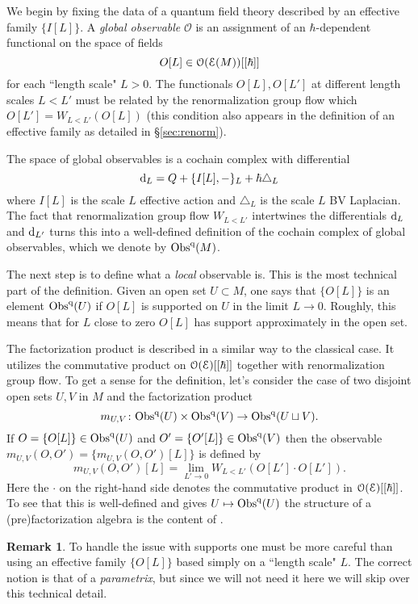 \documentclass[11pt, oneside, reqno]{amsart}
\theoremstyle{definition} \newtheorem{definition}{Definition}[section]
\theoremstyle{definition}
\theoremstyle{remark}
\theoremstyle{definition} \newtheorem{remark}[definition]{Remark}
\theoremstyle{definition} \newtheorem{remarks}[definition]{Remarks}
\theoremstyle{definition} \newtheorem{question}[definition]{Question}
\theoremstyle{definition} \newtheorem*{note}{Note}
\theoremstyle{definition} \newtheorem{example}[definition]{Example}
\theoremstyle{definition} \newtheorem{examples}[definition]{Examples}
\def\cE{\mathcal E}\def\cF{\mathcal F}\def\cG{\mathcal G}\def\cH{\mathcal H}
\newcommand{\mc}[1]{\mathcal{#1}}
\def\d{{\rm d}}
\newcommand{\Obs}{\mathrm{Obs}}
\begin{document}
We begin by fixing the data of a quantum field theory described by an effective family $\{I[L]\}$. 
A {\em global observable} $\mc O$ is an assignment of an $\hbar$-dependent functional on the space of fields
\[
O[L] \in \cO(\cE(M)) [[\hbar]]
\]
for each ``length scale" $L > 0$. 
The functionals $O[L], O[L']$ at different length scales $L < L'$ must be related by the renormalization group flow which $O[L'] = W_{L < L'} (O[L])$ (this condition also appears in the definition of an effective family as detailed in \S \ref{sec:renorm}).

The space of global observables is a cochain complex with differential 
\[
\d_L = Q + \{I[L], -\}_L + \hbar \triangle_L
\]
where $I[L]$ is the scale $L$ effective action and $\triangle_L$ is the scale $L$ BV Laplacian. 
The fact that renormalization group flow $W_{L<L'}$ intertwines the differentials $\d_L$ and $\d_{L'}$ turns this into a well-defined definition of the cochain complex of global observables, which we denote by $\Obs^{\rm q}(M)$. 

The next step is to define what a {\em local} observable is.
This is the most technical part of the definition. 
Given an open set $U \subset M$, one says that $\{O[L]\}$ is an element $\Obs^{\rm q} (U)$ if $O[L]$ is supported on $U$ in the limit $L \to 0$. 
Roughly, this means that for $L$ close to zero $O[L]$ has support approximately in the open set. 

The factorization product is described in a similar way to the classical case. 
It utilizes the commutative product on $\cO(\cE)[[\hbar]]$ together with renormalization group flow. 
To get a sense for the definition, let's consider the case of two disjoint open sets $U,V$ in $M$ and the factorization product
\[
m_{U,V} \colon \Obs^{\rm q}(U) \times \Obs^{\rm q} (V) \to \Obs^{\rm q}(U \sqcup V) .
\]
If $O = \{O[L]\} \in \Obs^{\rm q}(U)$ and $O' = \{O'[L]\} \in \Obs^{\rm q}(V)$ then the observable $m_{U,V} (O,O') = \{m_{U,V} (O,O') [L]\}$ is defined by
\[
m_{U,V} (O , O') [L] = \lim_{L' \to 0} W_{L < L'} \left( O [L'] \cdot O[L'] \right) .
\]
Here the $\cdot$ on the right-hand side denotes the commutative product in $\cO(\cE)[[\hbar]]$. 
To see that this is well-defined and gives $U \mapsto \Obs^{\rm q}(U)$ the structure of a (pre)factorization algebra is the content of \cite[Theorem 8.5.1.1]{Book2}. 

\begin{remark}
To handle the issue with supports one must be more careful than using an effective family $\{O[L]\}$ based simply on a ``length scale" $L$.
The correct notion is that of a {\em parametrix}, but since we will not need it here we will skip over this technical detail.
\end{remark}
\end{document}

